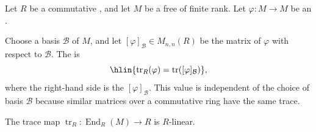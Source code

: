 \begin{definition} \label{definition:trace_of_an_endomorphism_of_a_free_finitely_generated_module_over_a_ring}
    Let $R$ be a commutative , and let $M$ be a free  of finite rank. Let $\varphi: M \to M$ be an .

    Choose a basis $\mathcal{B}$ of $M$, and let $[\varphi]_{\mathcal{B}} \in M_{n,n}(R)$ be the matrix of $\varphi$ with respect to $\mathcal{B}$. The  is
    $$\hlin{\operatorname{tr}_R(\varphi) = \operatorname{tr}([\varphi]_{\mathcal{B}})},$$
    where the right-hand side is the  $[\varphi]_{\mathcal{B}}$. This value is independent of the choice of basis $\mathcal{B}$ because similar matrices over a commutative ring have the same trace.

    The trace map $\operatorname{tr}_R: \operatorname{End}_R(M) \to R$ is $R$-linear.
\end{definition}
